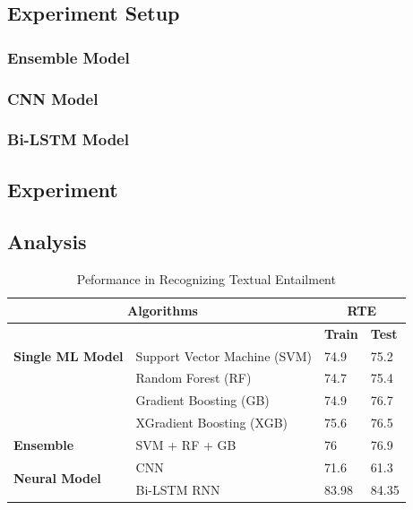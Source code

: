 \documentclass[12pt]{report} %
\begin{document}
\subsection{Experiment Setup}

\subsubsection{Ensemble Model}
\subsubsection{CNN Model}
\subsubsection{Bi-LSTM Model}
\subsection{Experiment}
\subsection{Analysis}

\begin{table}[]
	\centering
	\caption{ Peformance in Recognizing Textual Entailment}
	\label{my-label}
	\begin{tabular}{|l|l|l|l|}
		\hline
		\multicolumn{2}{|c|}{\textbf{Algorithms}}                                     & \multicolumn{2}{c|}{\textbf{RTE}}                   \\ \hline
		&                              & \multicolumn{1}{c|}{\textbf{Train}} & \textbf{Test} \\ \hline
		\multicolumn{1}{|c|}{\textbf{Single ML Model}} & Support Vector Machine (SVM) & 74.9                                & 75.2          \\ \cline{2-4}
		& Random Forest (RF)           & 74.7                                & 75.4          \\\cline{2-4}
		& Gradient Boosting (GB)       & 74.9                                & 76.7          \\ \cline{2-4}
		\textbf{}                                      & XGradient Boosting (XGB)     & 75.6                                & 76.5          \\ \hline
		\textbf{Ensemble}                              & SVM + RF + GB                & 76                                  & 76.9          \\ \hline
		\multirow{2}{*}{\textbf{Neural Model}}         & CNN                          & 71.6                                & 61.3          \\ \cline{2-4} 
		& Bi-LSTM RNN                  & 83.98                               & 84.35         \\ \hline
	\end{tabular}
\end{table}
\end{document}
